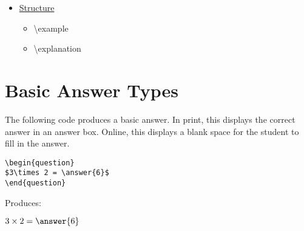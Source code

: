 \documentclass{ximera}
\begin{document}
\begin{remark}
\begin{itemize}
  \begin{itemize}
    \item begin\{problem\} ... end\{problem\}
    \item begin\{question\} ... end\{question\}
    \item begin\{exercise\} ... end\{exercise\}
    \item begin\{exploration\} ... end\{exploration\}
    \item begin\{xarmaBoost\} ... end\{xarmaBoost\}
  \end{itemize}
\item \hyperref[StructuralEnvironments]{Structure}
  \begin{itemize}
    \item \textbackslash example
    \item \textbackslash explanation
  \end{itemize}

\end{itemize}

\end{remark}


\section{Basic Answer Types}  
\label{BasicAnswerType}

\begin{example}
The following code produces a basic answer. In print, this displays the correct answer in an answer box. Online, this displays a blank space for the student to fill in the answer. 

\begin{verbatim}
\begin{question}
$3\times 2 = \answer{6}$
\end{question}
\end{verbatim}

Produces:

\begin{question}
$3\times 2 = \answer{6}$
\end{question}
\end{example}
\end{document}
